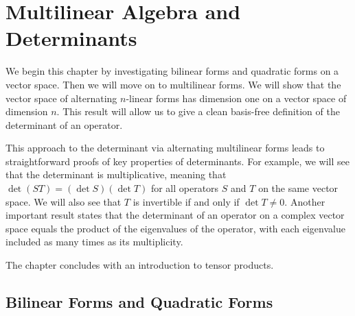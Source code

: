 
\chapter{Multilinear Algebra and Determinants} \label{MultLATensors}

We begin this chapter by investigating bilinear forms and quadratic forms on a vector space. Then we will move on to multilinear forms. We will show that the vector space of alternating $n$-linear forms has dimension one on a vector space of dimension $n$. This result will allow us to give a clean basis-free definition of the determinant of an operator.

This approach to the determinant via alternating multilinear forms leads to straightforward proofs of key properties of determinants. For example, we will see that the determinant is multiplicative, meaning that $\det (ST) = (\det S)(\det T)$ for all operators $S$ and $T$ on the same vector space. We will also see that $T$ is invertible if and only if $\det T \ne 0$. Another important result states that the determinant of an operator on a complex vector space equals the product of the eigenvalues of the operator, with each eigenvalue included as many times as its multiplicity.

The chapter concludes with an introduction to tensor products.





\section{Bilinear Forms and Quadratic Forms} \label{bilin_quad}

